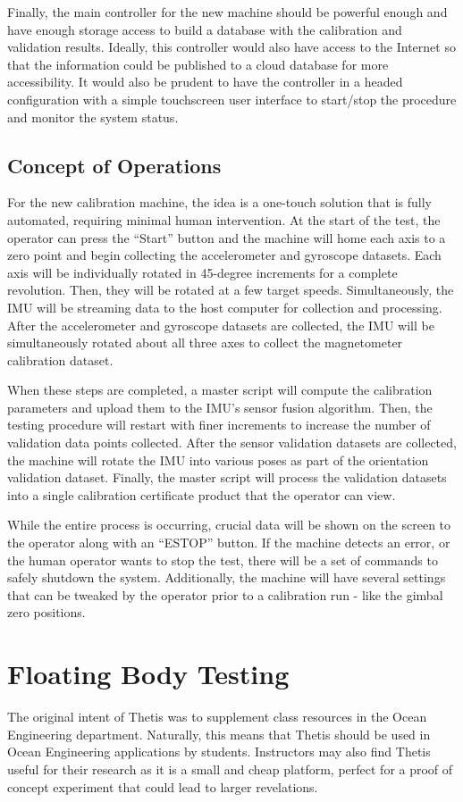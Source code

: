 Finally, the main controller for the new machine should be powerful enough and have enough storage access to build a database with the calibration and validation results.
Ideally, this controller would also have access to the Internet so that the information could be published to a cloud database for more accessibility.
It would also be prudent to have the controller in a headed configuration with a simple touchscreen user interface to start/stop the procedure and monitor the system status.

\subsection{Concept of Operations} 
For the new calibration machine, the idea is a one-touch solution that is fully automated, requiring minimal human intervention.
At the start of the test, the operator can press the ``Start'' button and the machine will home each axis to a zero point and begin collecting the accelerometer and gyroscope datasets.
Each axis will be individually rotated in 45-degree increments for a complete revolution.
Then, they will be rotated at a few target speeds.
Simultaneously, the IMU will be streaming data to the host computer for collection and processing.
After the accelerometer and gyroscope datasets are collected, the IMU will be simultaneously rotated about all three axes to collect the magnetometer calibration dataset.

When these steps are completed, a master script will compute the calibration parameters and upload them to the IMU's sensor fusion algorithm.
Then, the testing procedure will restart with finer increments to increase the number of validation data points collected.
After the sensor validation datasets are collected, the machine will rotate the IMU into various poses as part of the orientation validation dataset.
Finally, the master script will process the validation datasets into a single calibration certificate product that the operator can view.

While the entire process is occurring, crucial data will be shown on the screen to the operator along with an ``ESTOP'' button.
If the machine detects an error, or the human operator wants to stop the test, there will be a set of commands to safely shutdown the system.
Additionally, the machine will have several settings that can be tweaked by the operator prior to a calibration run - like the gimbal zero positions.

\section{Floating Body Testing} 
The original intent of Thetis was to supplement class resources in the Ocean Engineering department.
Naturally, this means that Thetis should be used in Ocean Engineering applications by students.
Instructors may also find Thetis useful for their research as it is a small and cheap platform, perfect for a proof of concept experiment that could lead to larger revelations.

